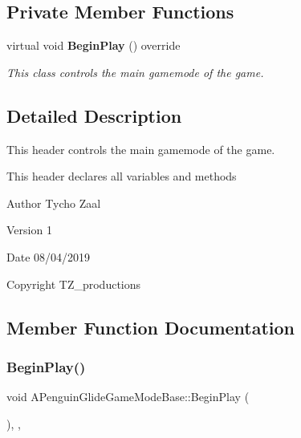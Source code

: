 \subsection*{Private Member Functions}
\begin{DoxyCompactItemize}
\item 
virtual void \textbf{ Begin\+Play} () override
\begin{DoxyCompactList}\small\item\em This class controls the main gamemode of the game. \end{DoxyCompactList}\end{DoxyCompactItemize}


\subsection{Detailed Description}
This header controls the main gamemode of the game. 

This header declares all variables and methods \begin{DoxyAuthor}{Author}
Tycho Zaal 
\end{DoxyAuthor}
\begin{DoxyVersion}{Version}
1 
\end{DoxyVersion}
\begin{DoxyDate}{Date}
08/04/2019 
\end{DoxyDate}
\begin{DoxyCopyright}{Copyright}
T\+Z\+\_\+productions 
\end{DoxyCopyright}


\subsection{Member Function Documentation}
\mbox{\label{class_a_penguin_glide_game_mode_base_a103f7390b1d9587772dcf66a0eea4cee}} 
\subsubsection{BeginPlay()}
{\footnotesize\ttfamily void A\+Penguin\+Glide\+Game\+Mode\+Base\+::\+Begin\+Play (\begin{DoxyParamCaption}{ }\end{DoxyParamCaption})\hspace{0.3cm}{\ttfamily [override]}, {\ttfamily [private]}, {\ttfamily [virtual]}}



